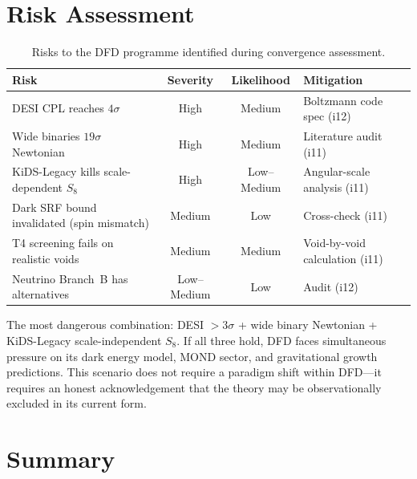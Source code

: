\documentclass[11pt]{article}
\begin{document}
\section{Risk Assessment}
\label{sec:risks}

\begin{table}[H]
\centering
\caption{Risks to the DFD programme identified during convergence assessment.}
\begin{tabular}{lccl}
\toprule
\textbf{Risk} & \textbf{Severity} & \textbf{Likelihood} & \textbf{Mitigation} \\
\midrule
DESI CPL reaches $4\sigma$ & High & Medium & Boltzmann code spec (i12) \\
Wide binaries $19\sigma$ Newtonian & High & Medium & Literature audit (i11) \\
KiDS-Legacy kills scale-dependent $S_8$ & High & Low--Medium & Angular-scale
  analysis (i11) \\
Dark SRF bound invalidated (spin mismatch) & Medium & Low & Cross-check (i11) \\
T4 screening fails on realistic voids & Medium & Medium & Void-by-void
  calculation (i11) \\
Neutrino Branch~B has alternatives & Low--Medium & Low & Audit (i12) \\
\bottomrule
\end{tabular}
\end{table}

The most dangerous combination: DESI $> 3\sigma$ + wide binary Newtonian +
KiDS-Legacy scale-independent $S_8$. If all three hold, DFD faces
simultaneous pressure on its dark energy model, MOND sector, and
gravitational growth predictions. This scenario does not require a
paradigm shift within DFD---it requires an honest acknowledgement that
the theory may be observationally excluded in its current form.


\section{Summary}
\label{sec:summary}
\end{document}

